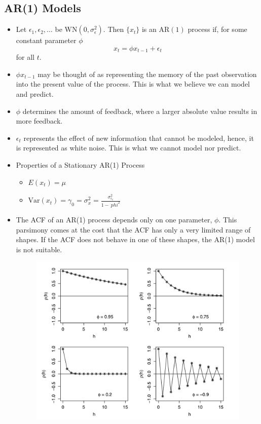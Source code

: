 \documentclass[11pt]{article}
\begin{document}
\subsection{AR(1) Models}
\begin{itemize}
    \item Let $\epsilon_1, \epsilon_2, \ldots$ be $\text{WN}(0, \sigma_{\epsilon}^{2})$. Then 
    $\{x_t\}$ is an $\text{AR}(1)$ process if, for some constant parameter $\phi$
    \[ x_t = \phi x_{t-1} + \epsilon_t \]
    for all $t$.
    \item $\phi x_{t-1}$ may be thought of as representing the memory of the past observation
    into the present value of the process. This is what we believe we can model and predict.
    \item $\phi$ determines the amount of feedback, where a larger absolute value results in 
    more feedback.
    \item $\epsilon_t$ represents the effect of new information that cannot be modeled, hence,
    it is represented as white noise. This is what we cannot model nor predict. 
    \item Properties of a Stationary AR(1) Process 
    \begin{itemize}
        \item $E(x_t) = \mu$ 
        \item $\text{Var}(x_t)= \gamma_0 = \sigma_x^2 = \frac{\sigma_{\epsilon_t}^{2}}{1-\
        phi^2}$
    \end{itemize}
    \item The ACF of an AR(1) process depends only on one parameter, $\phi$. This parsimony 
    comes at the cost that the ACF has only a very limited range of shapes. If the ACF does not
    behave in one of these shapes, the AR(1) model is not suitable.
    \begin{figure}[H] 
        \centering 
        \includegraphics[width=5in]{imgs/ar1_acf.png}

\end{figure}
\end{itemize}
\end{document}
